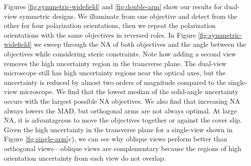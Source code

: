 \documentclass[10pt]{article}
\begin{document}
Figures \ref{fig:symmetric-widefield} and \ref{fig:double-arm} show our results
for dual-view symmetric designs. We illuminate from one objective and
detect from the other for four polarization orientations, then we repeat the
polarization orientations with the same objectives in reversed roles. In Figure
\ref{fig:symmetric-widefield} we sweep through the NA of both objectives and the
angle between the objectives while considering steric constraints. Note how
adding a second view removes the high uncertainty region in the transverse
plane. The dual-view microscope still has high uncertainty regions near the
optical axes, but the uncertainty is reduced by almost two orders of magnitude
compared to the single-view microscope. We find that the lowest median of the
solid-angle uncertainty occurs with the largest possible NA objectives. We also
find that increasing NA always lowers the MAD, but orthogonal arms are not
always optimal. At large NA, it is advantageous to move the objectives together
or against the cover slip. Given the high uncertainty in the transverse plane
for a single-view shown in Figure \ref{fig:single-arm}c), we can see why oblique
views perform better than orthogonal views---oblique views are complementary
because the regions of high orientation uncertainty from each view do not
overlap. 
\end{document}
